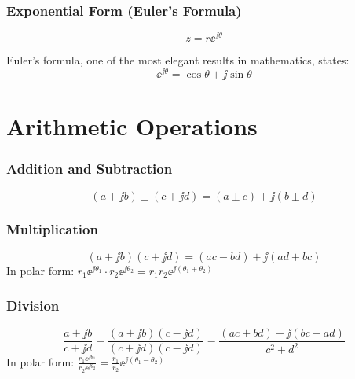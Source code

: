 \subsubsection{Exponential Form (Euler's Formula)}
\begin{equation}
z = r \ee^{\jj\theta}
\end{equation}

Euler's formula, one of the most elegant results in mathematics, states:
\begin{equation}
\boxed{\ee^{\jj\theta} = \cos\theta + \jj\sin\theta}
\end{equation}






\section{Arithmetic Operations}

\subsubsection{Addition and Subtraction}
\begin{equation}
(a + \jj b) \pm (c + \jj d) = (a \pm c) + \jj(b \pm d)
\end{equation}

\subsubsection{Multiplication}
\begin{equation}
(a + \jj b)(c + \jj d) = (ac - bd) + \jj(ad + bc)
\end{equation}
In polar form: $r_1 \ee^{\jj\theta_1} \cdot r_2 \ee^{\jj\theta_2} = r_1 r_2 \ee^{\jj(\theta_1 + \theta_2)}$

\subsubsection{Division}
\begin{equation}
\frac{a + \jj b}{c + \jj d} = \frac{(a + \jj b)(c - \jj d)}{(c + \jj d)(c - \jj d)} = \frac{(ac + bd) + \jj(bc - ad)}{c^2 + d^2}
\end{equation}
In polar form: $\frac{r_1 \ee^{\jj\theta_1}}{r_2 \ee^{\jj\theta_2}} = \frac{r_1}{r_2} \ee^{\jj(\theta_1 - \theta_2)}$

